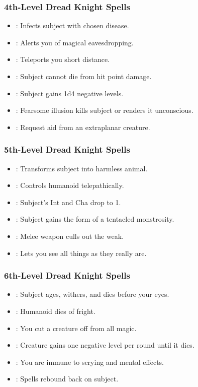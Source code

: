 \subsubsection{4th-Level Dread Knight Spells}
\begin{itemize}
\item {}: Infects subject with chosen disease.
\item {}: Alerts you of magical eavesdropping.
\item {}: Teleports you short distance.
\item {}: Subject cannot die from hit point damage.
\item {}: Subject gains 1d4 negative levels.
\item {}: Fearsome illusion kills subject or renders it unconscious.
\item {}: Request aid from an extraplanar creature.
\end{itemize}
\subsubsection{5th-Level Dread Knight Spells}
\begin{itemize}
\item {}: Transforms subject into harmless animal.
\item {}: Controls humanoid telepathically.
\item {}: Subject's Int and Cha drop to 1.
\item {}: Subject gains the form of a tentacled monstrosity.
\item {}: Melee weapon culls out the weak.
\item {}: Lets you see all things as they really are.
\end{itemize}
\subsubsection{6th-Level Dread Knight Spells}
\begin{itemize}
\item {}: Subject ages, withers, and dies before your eyes.
\item {}: Humanoid dies of fright.
\item {}: You cut a creature off from all magic.
\item {}: Creature gains one negative level per round until it dies.
\item {}: You are immune to scrying and mental effects.
\item {}: Spells rebound back on subject.
\end{itemize}

